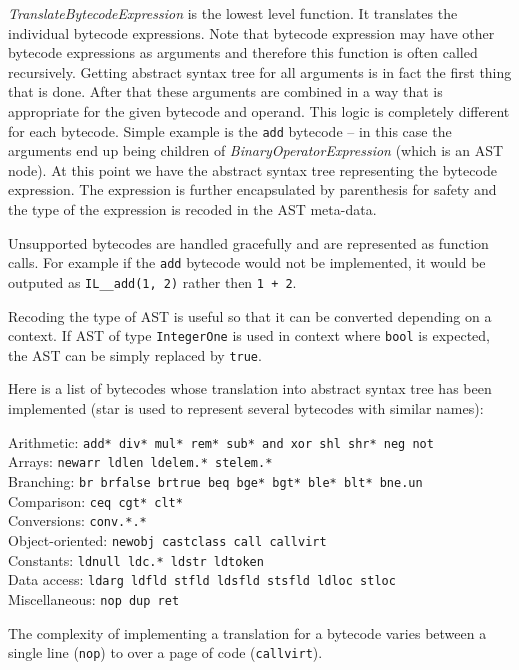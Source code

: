 \documentclass[12pt,twoside,notitlepage]{report}
\begin{document}
\emph{TranslateBytecodeExpression} is the lowest level function.
It translates the individual bytecode expressions.
Note that bytecode expression may have other bytecode expressions
as arguments and therefore this function is often called recursively.
Getting abstract syntax tree for all arguments is in fact the
first thing that is done.  After that these arguments are combined in
a way that is appropriate for the given bytecode and operand.
This logic is completely different for each bytecode.  
Simple example is the \verb|add| bytecode --  
in this case the arguments end up being children of 
\emph{BinaryOperatorExpression} (which is an AST node).
At this point we have the abstract syntax tree representing the 
bytecode expression. 
The expression is further encapsulated by parenthesis for safety
and the type of the expression is recoded in the AST meta-data.

Unsupported bytecodes are handled gracefully and are represented as
function calls.  For example if the \verb|add| bytecode would
not be implemented, it would be outputed as \verb|IL__add(1, 2)|
rather then \verb|1 + 2|.

Recoding the type of AST is useful so that it can be converted
depending on a context.  If AST of type \verb|IntegerOne| is
used in context where \verb|bool| is expected, the AST can
be simply replaced by \verb|true|.

Here is a list of bytecodes whose translation into abstract syntax
tree has been implemented
(star is used to represent several bytecodes with similar names):

Arithmetic: \texttt{add* div* mul* rem* sub* and xor shl shr* neg not} \\
Arrays: \texttt{newarr ldlen ldelem.* stelem.*} \\
Branching: \texttt{br brfalse brtrue beq bge* bgt* ble* blt* bne.un} \\
Comparison: \texttt{ceq cgt* clt*} \\
Conversions: \texttt{conv.*.*} \\
Object-oriented: \texttt{newobj castclass call callvirt} \\
Constants: \texttt{ldnull ldc.* ldstr ldtoken} \\
Data access: \texttt{ldarg ldfld stfld ldsfld stsfld ldloc stloc} \\
Miscellaneous: \texttt{nop dup ret}

The complexity of implementing a translation for a bytecode varies
between a single line (\verb|nop|) to over a page of code (\verb|callvirt|).
\end{document}
